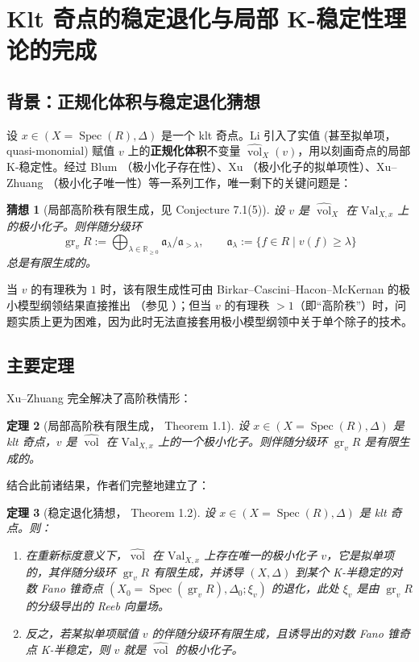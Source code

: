 \documentclass[11pt,a4paper]{article}
\newtheorem{theorem}{定理}[section]
\newtheorem{conjecture}[theorem]{猜想}
\theoremstyle{definition}
\theoremstyle{remark}
\DeclareMathOperator{\vol}{vol}
\DeclareMathOperator{\Spec}{Spec}
\DeclareMathOperator{\gr}{gr}
\newcommand{\R}{\mathbb{R}}
\begin{document}
\section{Klt 奇点的稳定退化与局部 K-稳定性理论的完成}

\subsection{背景：正规化体积与稳定退化猜想}

设 $x \in (X = \Spec(R), \Delta)$ 是一个 klt 奇点。Li \cite{Li2018} 引入了实值 (甚至拟单项，quasi-monomial) 赋值 $v$ 上的\textbf{正规化体积}不变量 $\widehat{\vol}_X(v)$，用以刻画奇点的局部 K-稳定性。经过 Blum \cite{Blum2018}（极小化子存在性）、Xu \cite{Xu2020}（极小化子的拟单项性）、Xu--Zhuang \cite{XZ2021}（极小化子唯一性）等一系列工作，唯一剩下的关键问题是：

\begin{conjecture}[局部高阶秩有限生成，见 \cite{Li2018} Conjecture 7.1(5)]
设 $v$ 是 $\widehat{\vol}_X$ 在 $\mathrm{Val}_{X,x}$ 上的极小化子。则伴随分级环
\[
\gr_v R := \bigoplus_{\lambda \in \R_{\ge 0}} \mathfrak{a}_\lambda / \mathfrak{a}_{>\lambda}, \qquad \mathfrak{a}_\lambda := \{ f \in R \mid v(f) \ge \lambda \}
\]
总是有限生成的。
\end{conjecture}

当 $v$ 的有理秩为 $1$ 时，该有限生成性可由 Birkar--Cascini--Hacon--McKernan 的极小模型纲领结果直接推出 \cite{BCHM2010}（参见 \cite{Blum2018,Xu2020}）；但当 $v$ 的有理秩 $> 1$（即“高阶秩”）时，问题实质上更为困难，因为此时无法直接套用极小模型纲领中关于单个除子的技术。

\subsection{主要定理}

Xu--Zhuang \cite{XZ2025} 完全解决了高阶秩情形：

\begin{theorem}[局部高阶秩有限生成，\cite{XZ2025} Theorem 1.1]
设 $x \in (X = \Spec(R), \Delta)$ 是 klt 奇点，$v$ 是 $\widehat{\vol}$ 在 $\mathrm{Val}_{X,x}$ 上的一个极小化子。则伴随分级环 $\gr_v R$ 是有限生成的。
\end{theorem}

结合此前诸结果，作者们完整地建立了：

\begin{theorem}[稳定退化猜想，\cite{XZ2025} Theorem 1.2]
设 $x \in (X = \Spec(R), \Delta)$ 是 klt 奇点。则：
\begin{enumerate}[label=(\arabic*)]
  \item 在重新标度意义下，$\widehat{\vol}$ 在 $\mathrm{Val}_{X,x}$ 上存在唯一的极小化子 $v$，它是拟单项的，其伴随分级环 $\gr_v R$ 有限生成，并诱导 $(X,\Delta)$ 到某个 K-半稳定的对数 Fano 锥奇点 $(X_0 = \Spec(\gr_v R), \Delta_0; \xi_v)$ 的退化，此处 $\xi_v$ 是由 $\gr_v R$ 的分级导出的 Reeb 向量场。
  \item 反之，若某拟单项赋值 $v$ 的伴随分级环有限生成，且诱导出的对数 Fano 锥奇点 K-半稳定，则 $v$ 就是 $\widehat{\vol}$ 的极小化子。
\end{enumerate}
\end{theorem}
\end{document}
